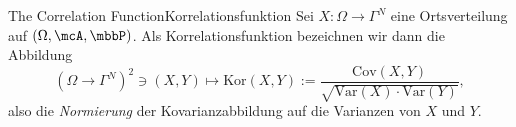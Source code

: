 \begin{mdef}{The Correlation Function}{Korrelationsfunktion}
    Sei $X:\Omega\to\Gamma^N$ eine Ortsverteilung auf $(\Omega,\mcA,\mbbP)$. Als Korrelationsfunktion bezeichnen wir dann die Abbildung
    \[
        (\Omega\to\Gamma^N)^2\ni (X,Y)\mapsto \text{Kor}(X,Y) := \frac{\text{Cov}(X,Y)}{\sqrt{\text{Var}(X)\cdot\text{Var}(Y)}},
    \]
    also die \emph{Normierung} der Kovarianzabbildung auf die Varianzen von $X$ und $Y$.
\end{mdef}